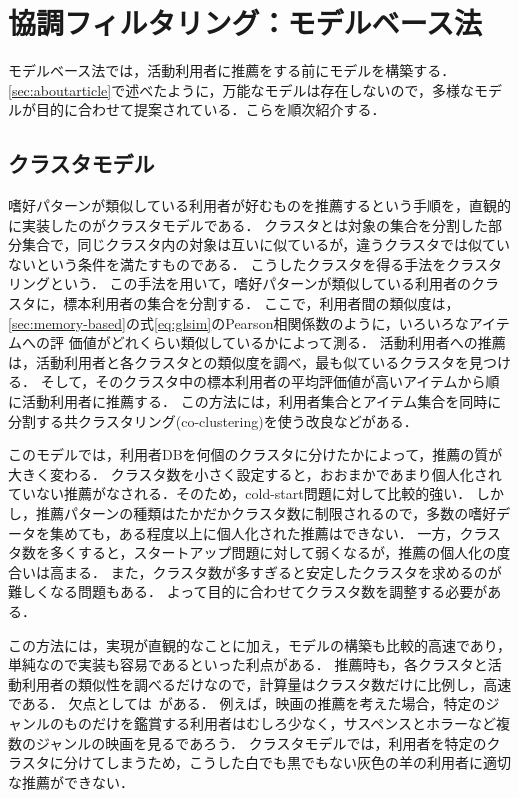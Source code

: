 \chapter{協調フィルタリング：モデルベース法}
\label{chap:modelbase}

モデルベース法では，活動利用者に推薦をする前にモデルを構築する．
\ref{sec:aboutarticle}で述べたように，万能なモデルは存在しないので，多様なモデルが目的に合わせて提案されている．こらを順次紹介する．

\section{クラスタモデル}
\label{sec:clustermodel}

嗜好パターンが類似している利用者が好むものを推薦するという手順を，直観的に実装したのがクラスタモデルである\cite{uai:98:01,epublist:039}．
クラスタとは対象の集合を分割した部分集合で，同じクラスタ内の対象は互いに似ているが，違うクラスタでは似ていないという条件を満たすものである．
こうしたクラスタを得る手法をクラスタリングという\cite{jpublist:034,jb:038:00,jb:020:00}．
この手法を用いて，嗜好パターンが類似している利用者のクラスタに，標本利用者の集合を分割する．
ここで，利用者間の類似度は，\ref{sec:memory-based}の式\eqref{eq:glsim}のPearson相関係数のように，いろいろなアイテムへの評
価値がどれくらい類似しているかによって測る．
活動利用者への推薦は，活動利用者と各クラスタとの類似度を調べ，最も似ているクラスタを見つける．
そして，そのクラスタ中の標本利用者の平均評価値が高いアイテムから順に活動利用者に推薦する．
この方法には，利用者集合とアイテム集合を同時に分割する共クラスタリング(co-clustering)を使う改良\cite{icdm:05:05}などがある．

このモデルでは，利用者DBを何個のクラスタに分けたかによって，推薦の質が大きく変わる．
クラスタ数を小さく設定すると，おおまかであまり個人化されていない推薦がなされる．そのため，cold-start問題に対して比較的強い．
しかし，推薦パターンの種類はたかだかクラスタ数に制限されるので，多数の嗜好データを集めても，ある程度以上に個人化された推薦はできない．
一方，クラスタ数を多くすると，スタートアップ問題に対して弱くなるが，推薦の個人化の度合いは高まる．
また，クラスタ数が多すぎると安定したクラスタを求めるのが難しくなる問題もある．
よって目的に合わせてクラスタ数を調整する必要がある．

この方法には，実現が直観的なことに加え，モデルの構築も比較的高速であり，単純なので実装も容易であるといった利点がある．
推薦時も，各クラスタと活動利用者の類似性を調べるだけなので，計算量はクラスタ数だけに比例し，高速である．
欠点としては~\cite{ej:048}がある．
例えば，映画の推薦を考えた場合，特定のジャンルのものだけを鑑賞する利用者はむしろ少なく，サスペンスとホラーなど複数のジャンルの映画を見るであろう．
クラスタモデルでは，利用者を特定のクラスタに分けてしまうため，こうした白でも黒でもない灰色の羊の利用者に適切な推薦ができない．

